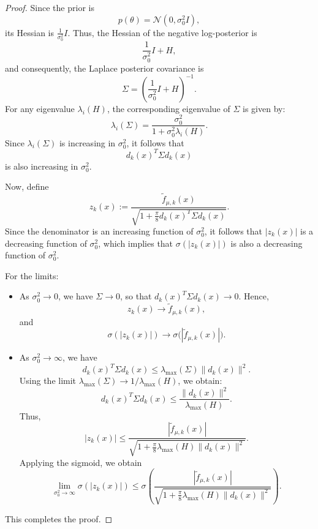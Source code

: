 \documentclass{article}
\begin{document}
\begin{proof}
Since the prior is 
\[
p(\theta) = \mathcal{N}(0, \sigma_0^2 I),
\]
its Hessian is $\frac{1}{\sigma_0^2} I$. Thus, the Hessian of the negative log-posterior is
\[
\frac{1}{\sigma_0^2} I + H,
\]
and consequently, the Laplace posterior covariance is
\[
\Sigma = \left(\frac{1}{\sigma_0^2} I + H \right)^{-1}.
\]
For any eigenvalue $\lambda_i(H)$, the corresponding eigenvalue of $\Sigma$ is given by:
\[
\lambda_i(\Sigma) = \frac{\sigma_0^2}{1 + \sigma_0^2 \lambda_i(H)}.
\]
Since $\lambda_i(\Sigma)$ is increasing in $\sigma_0^2$, it follows that 
\[
d_k(x)^T \Sigma d_k(x)
\]
is also increasing in $\sigma_0^2$.

Now, define
\[
z_k(x) := \frac{\tilde{f}_{\mu,k}(x)}{\sqrt{1+\frac{\pi}{8} d_k(x)^T \Sigma d_k(x)}}.
\]
Since the denominator is an increasing function of $\sigma_0^2$, it follows that $|z_k(x)|$ is a decreasing function of $\sigma_0^2$, which implies that $\sigma(|z_k(x)|)$ is also a decreasing function of $\sigma_0^2$.

For the limits:
\begin{itemize}
    \item As $\sigma_0^2 \to 0$, we have $\Sigma \to 0$, so that $d_k(x)^T \Sigma d_k(x) \to 0$. Hence, 
    \[
    z_k(x) \to \tilde{f}_{\mu,k}(x),
    \]
    and
    \[
    \sigma(|z_k(x)|) \to \sigma\bigl(|\tilde{f}_{\mu,k}(x)|\bigr).
    \]
    
    \item As $\sigma_0^2 \to \infty$, we have 
    \[
    d_k(x)^T \Sigma d_k(x) \leq \lambda_{\max}(\Sigma) \|d_k(x)\|^2.
    \]
    Using the limit $\lambda_{\max}(\Sigma) \to 1/\lambda_{\max}(H)$, we obtain:
    \[
    d_k(x)^T \Sigma d_k(x) \leq \frac{\|d_k(x)\|^2}{\lambda_{\max}(H)}.
    \]
    Thus, 
    \[
    |z_k(x)| \leq \frac{|\tilde{f}_{\mu,k}(x)|}{\sqrt{1+\frac{\pi}{8} \lambda_{\max}(H) \|d_k(x)\|^2}}.
    \]
    Applying the sigmoid, we obtain
    \[
    \lim_{\sigma_0^2 \to \infty} \sigma(|z_k(x)|) \leq \sigma\!\left( \frac{|\tilde{f}_{\mu,k}(x)|}{\sqrt{1+\frac{\pi}{8} \lambda_{\max}(H) \|d_k(x)\|^2}} \right).
    \]
\end{itemize}
This completes the proof.
\end{proof}
\end{document}
